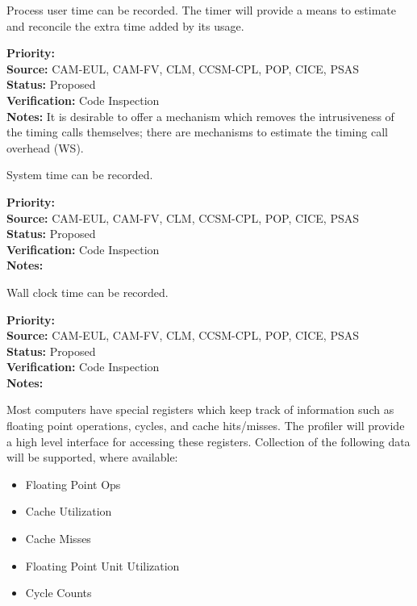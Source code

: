 
Process user time can be recorded.
The timer will provide a means to estimate and reconcile the extra time added by its usage.

\begin{reqlist}
{\bf Priority:}  \\
{\bf Source:} CAM-EUL, CAM-FV, CLM, CCSM-CPL, POP, CICE, PSAS \\
{\bf Status:} Proposed \\
{\bf Verification:} Code Inspection \\
{\bf Notes:} It is desirable to offer a mechanism which removes the
  intrusiveness of the timing calls themselves; there are mechanisms
  to estimate the timing call overhead (WS).
  
\end{reqlist}


System time can be recorded.

\begin{reqlist}
{\bf Priority:}  \\
{\bf Source:} CAM-EUL, CAM-FV, CLM, CCSM-CPL, POP, CICE, PSAS \\
{\bf Status:} Proposed \\
{\bf Verification:} Code Inspection \\
{\bf Notes:} 
\end{reqlist}



Wall clock time can be recorded.

\begin{reqlist}
{\bf Priority:}  \\
{\bf Source:} CAM-EUL, CAM-FV, CLM, CCSM-CPL, POP, CICE, PSAS \\
{\bf Status:} Proposed \\
{\bf Verification:} Code Inspection \\
{\bf Notes:} 
\end{reqlist}



Most computers have special registers which keep track of information such
as floating point operations, cycles, and cache hits/misses.  The profiler will
provide a high level interface for accessing these registers.
Collection of the following data will be supported, where available:
\begin{itemize}
\item{Floating Point Ops}
\item{Cache Utilization}
\item{Cache Misses}
\item{Floating Point Unit Utilization}
\item{Cycle Counts}
\end{itemize}

